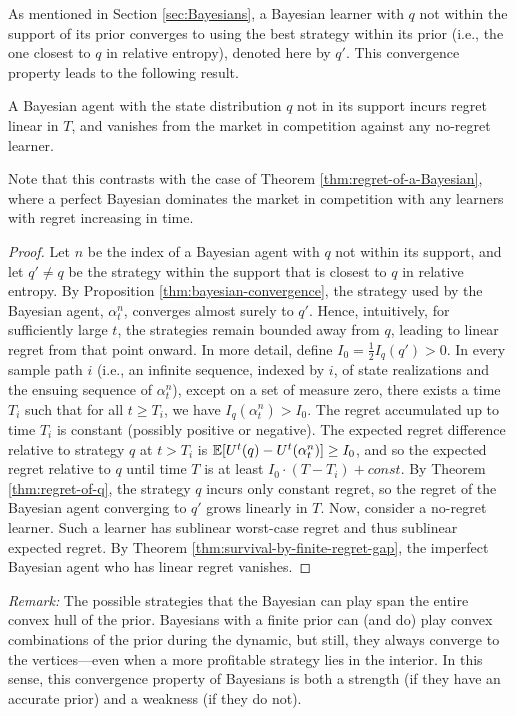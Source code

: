 As mentioned in Section \ref{sec:Bayesians}, a Bayesian learner with $q$ not within the support of its prior converges to using the best strategy within its prior (i.e., the one closest to $q$ in relative entropy), denoted here by $q'$. 
This convergence property leads to the following result. 
\begin{theorem}\label{thm:wrong-Bayesians-vanish}
    A Bayesian agent with the state distribution $q$ not in its support incurs regret 
    linear in $T$, and vanishes from the market in competition against any no-regret learner.   
\end{theorem}
Note that this contrasts with the case of Theorem \ref{thm:regret-of-a-Bayesian}, where a perfect Bayesian dominates the market in competition with any learners with regret increasing in time.
\begin{proof}
Let $n$ be the index of a Bayesian agent with $q$ not within its support, and let $q' \neq q$ be the strategy within the support that is closest to $q$ in relative entropy. By Proposition \ref{thm:bayesian-convergence}, the strategy used by the Bayesian agent, $\alpha^n_t$, converges almost surely to $q'$. Hence, intuitively, for sufficiently large $t$, the strategies remain bounded away from $q$, leading to linear regret from that point onward. In more detail, define $I_0 = \frac{1}{2} I_q(q') > 0$. In every sample path $i$ (i.e., an infinite sequence, indexed by $i$, of state realizations and the ensuing sequence of $\alpha^n_t$), except on a set of measure zero, there exists a time $T_i$ such that for all $t \geq T_i$, we have $I_q(\alpha^n_t) > I_0$. The regret accumulated up to time $T_i$ is constant (possibly positive or negative). The expected regret difference relative to strategy $q$ at $t > T_i$ is $\operatorname{\mathbb{E}}[U^t(q) - U^t(\alpha^n_t)] \geq I_0$, and so the expected regret relative to $q$ until time $T$ is at least $I_0 \cdot (T - T_i) + const$. By Theorem \ref{thm:regret-of-q}, the strategy $q$ incurs only constant regret, so the regret of the Bayesian agent converging to $q'$ grows linearly in $T$. Now, consider a no-regret learner. Such a learner has sublinear worst-case regret and thus sublinear expected regret. By Theorem \ref{thm:survival-by-finite-regret-gap}, the imperfect Bayesian agent who has linear regret vanishes.    
\end{proof}
\noindent
{\em Remark:}
The possible strategies that the Bayesian can play span the entire convex hull of the prior. 
Bayesians with a finite prior can (and do) play convex combinations of the prior during the dynamic, but still, they always converge to the vertices---even when a more profitable strategy lies in the interior. 
In this sense, this convergence property of Bayesians is both a strength (if they have an accurate prior) and a weakness (if they do not). 
\vspace{5pt}

